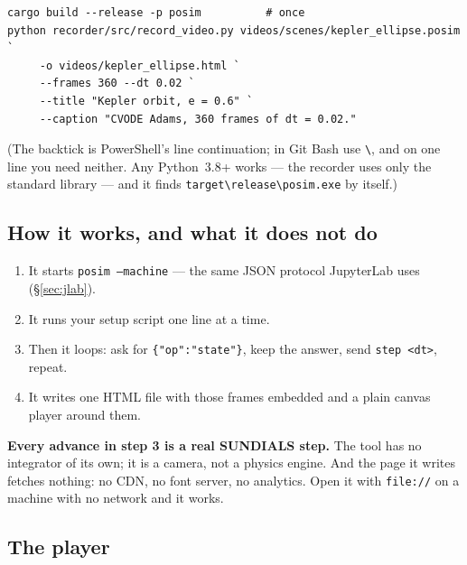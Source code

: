 \documentclass[11pt]{article}
\newcommand{\code}[1]{\texttt{#1}}
\begin{document}
\begin{lstlisting}
cargo build --release -p posim          # once
python recorder/src/record_video.py videos/scenes/kepler_ellipse.posim `
     -o videos/kepler_ellipse.html `
     --frames 360 --dt 0.02 `
     --title "Kepler orbit, e = 0.6" `
     --caption "CVODE Adams, 360 frames of dt = 0.02."
\end{lstlisting}

(The backtick is PowerShell's line continuation; in Git Bash use
\code{\textbackslash{}}, and on one line you need neither. Any
Python~3.8+ works --- the recorder uses only the standard library ---
and it finds \code{target\textbackslash{}release\textbackslash{}posim.exe}
by itself.)

\subsection{How it works, and what it does not do}

\begin{enumerate}
\item It starts \code{posim --machine} --- the same JSON protocol
      JupyterLab uses (\S\ref{sec:jlab}).
\item It runs your setup script one line at a time.
\item Then it loops: ask for \code{\{"op":"state"\}}, keep the answer,
      send \code{step <dt>}, repeat.
\item It writes one HTML file with those frames embedded and a plain
      canvas player around them.
\end{enumerate}

\textbf{Every advance in step 3 is a real SUNDIALS step.} The tool has
no integrator of its own; it is a camera, not a physics engine. And the
page it writes fetches nothing: no CDN, no font server, no analytics.
Open it with \code{file://} on a machine with no network and it works.

\subsection{The player}
\end{document}
